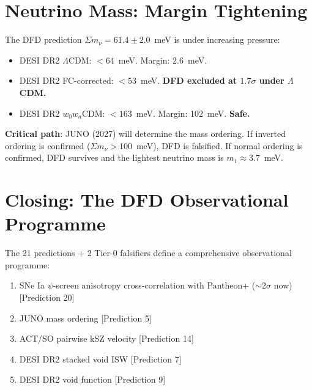 \documentclass[11pt,a4paper]{article}
\begin{document}
\section{Neutrino Mass: Margin Tightening}

The DFD prediction $\Sigma m_\nu = 61.4 \pm 2.0$~meV is under
increasing pressure:
\begin{itemize}[nosep]
\item DESI DR2 $\Lambda$CDM: $< 64$~meV.  Margin: 2.6~meV.
\item DESI DR2 FC-corrected: $< 53$~meV.  \textbf{DFD excluded at
  $1.7\sigma$ under $\Lambda$CDM.}
\item DESI DR2 $w_0 w_a$CDM: $< 163$~meV.  Margin: 102~meV.
  \textbf{Safe.}
\end{itemize}

\textbf{Critical path}: JUNO (2027) will determine the mass ordering.
If inverted ordering is confirmed ($\Sigma m_\nu > 100$~meV), DFD
is falsified.  If normal ordering is confirmed, DFD survives and
the lightest neutrino mass is $m_1 \approx 3.7$~meV.


\section*{Closing: The DFD Observational Programme}

The 21 predictions + 2 Tier-0 falsifiers define a comprehensive
observational programme:

\begin{tcolorbox}[colback=green!5!white, colframe=green!60!black,
  title=\textbf{Immediate (2026--2027)}]
\begin{enumerate}[nosep]
\item SNe Ia $\psi$-screen anisotropy cross-correlation with
  Pantheon+ ($\sim 2\sigma$ now) [Prediction 20]
\item JUNO mass ordering [Prediction 5]
\item ACT/SO pairwise kSZ velocity [Prediction 14]
\item DESI DR2 stacked void ISW [Prediction 7]
\item DESI DR2 void function [Prediction 9]
\end{enumerate}
\end{tcolorbox}
\end{document}

